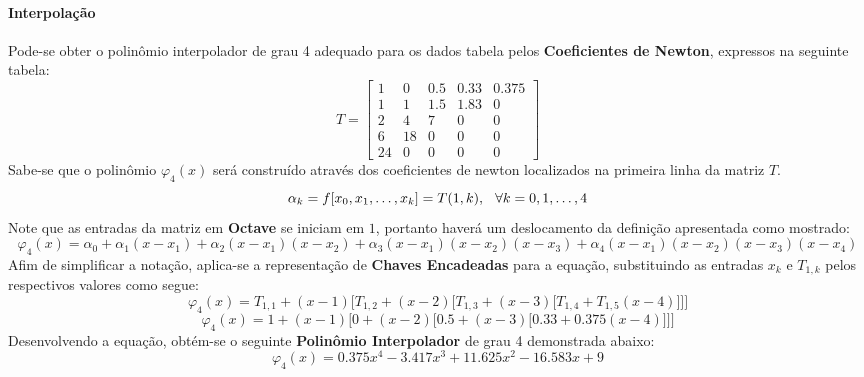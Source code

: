 \documentclass{article}
\begin{document}
            \paragraph{Interpolação}Pode-se obter o polinômio interpolador de grau 4 adequado para os dados tabela pelos \textbf{Coeficientes de Newton}, expressos na seguinte tabela:
                \[T = 
                    \begin{bmatrix}
                         1 &  0 & 0.5 & 0.33 & 0.375\\
                         1 &  1 & 1.5 & 1.83 & 0\\
                         2 &  4 & 7   & 0    & 0\\
                         6 & 18 & 0   & 0    & 0\\
                        24 &  0 & 0   & 0    & 0
                    \end{bmatrix}
                \]
            Sabe-se que o polinômio $\varphi_{4}(x)$ será construído através dos coeficientes de newton localizados na primeira linha da matriz $T$.
                \[\alpha_{k} = f[x_{0}, x_{1}, \dots, x_{k}] = T(1, k), \hspace{2.5mm} \forall k = 0, 1, \dots, 4\]
            Note que as entradas da matriz em \textbf{Octave} se iniciam em $1$, portanto haverá um deslocamento da definição apresentada como mostrado:
                \[\varphi_{4}(x) = \alpha_{0} +
                                   \alpha_{1}(x - x_{1}) +
                                   \alpha_{2}(x - x_{1})(x - x_{2}) +
                                   \alpha_{3}(x - x_{1})(x - x_{2})(x - x_{3}) +
                                   \alpha_{4}(x - x_{1})(x - x_{2})(x - x_{3})(x - x_{4})\]
            Afim de simplificar a notação, aplica-se a representação de \textbf{Chaves Encadeadas} para a equação, substituindo as entradas $x_{k}$ e $T_{1,k}$ pelos respectivos valores como segue:
                \[\varphi_{4}(x) = T_{1,1}+(x - 1) \bigg[T_{1,2} + (x - 2) \Big[T_{1,3} + (x - 3) \big[T_{1,4} + T_{1,5}(x - 4)\big]\Big]\bigg]\]
                \[\varphi_{4}(x) = 1+(x - 1) \bigg[0 + (x - 2) \Big[0.5 + (x - 3) \big[0.33 + 0.375(x - 4)\big]\Big]\bigg]\]
            Desenvolvendo a equação, obtém-se o seguinte \textbf{Polinômio Interpolador} de grau 4 demonstrada abaixo:
                \[\boxed{\varphi_{4}(x) = 0.375x^4 - 3.417x^3 + 11.625x^2 - 16.583x + 9}\]
\end{document}

